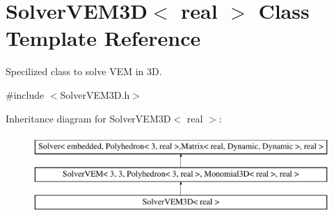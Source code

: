 \hypertarget{class_solver_v_e_m3_d}{}\section{Solver\+V\+E\+M3D$<$ real $>$ Class Template Reference}
\label{class_solver_v_e_m3_d}


Specilized class to solve V\+EM in 3D.  




{\ttfamily \#include $<$Solver\+V\+E\+M3\+D.\+h$>$}

Inheritance diagram for Solver\+V\+E\+M3D$<$ real $>$\+:\begin{figure}[H]
\begin{center}
\leavevmode
\includegraphics[height=3.000000cm]{class_solver_v_e_m3_d}
\end{center}
\end{figure}
